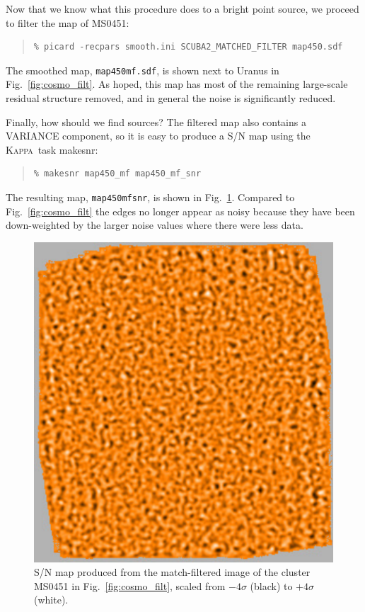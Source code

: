 \documentclass[twoside,11pt]{article}
\newcommand{\xref}[3]{#1}
\renewcommand{\_}{\texttt{\symbol{95}}}
\newenvironment{myquote}{\begin{quote}\begin{small}}{\end{small}\end{quote}}
\newcommand{\Kappa}{\xref{\textsc{Kappa}}{sun95}{}}
\newcommand{\task}[1]{\textsf{#1}}
\newcommand{\makesnr}{\xref{\task{makesnr}}{sun95}{MAKESNR}}
\begin{document}
Now that we know what this procedure does to a bright point source, we
proceed to filter the map of MS0451:

\begin{myquote}
\begin{verbatim}
% picard -recpars smooth.ini SCUBA2_MATCHED_FILTER map450.sdf
\end{verbatim}
\end{myquote}

The smoothed map, \texttt{map450\_mf.sdf}, is shown next to Uranus in
Fig.~\ref{fig:cosmo_filt}. As hoped, this map has most of the
remaining large-scale residual structure removed, and in general the
noise is significantly reduced.

Finally, how should we find sources? The filtered map also contains a
VARIANCE component, so it is easy to produce a S/N map using the \Kappa\
task \makesnr:

\begin{myquote}
\begin{verbatim}
% makesnr map450_mf map450_mf_snr
\end{verbatim}
\end{myquote}

The resulting map, \texttt{map450\_mf\_snr}, is shown in
Fig.~\ref{fig:cosmo_snr}. Compared to Fig.~\ref{fig:cosmo_filt} the
edges no longer appear as noisy because they have been down-weighted
by the larger noise values where there were less data.

\begin{figure}
\begin{center}
\includegraphics[width=0.49\linewidth]{sc19_cosmo_map_snr}
\caption{S/N map produced from the match-filtered image of the cluster
  MS0451 in Fig.~\ref{fig:cosmo_filt}, scaled from $-4\sigma$ (black)
  to $+4\sigma$ (white).}
\label{fig:cosmo_snr}
\end{center}
\end{figure}
\end{document}
